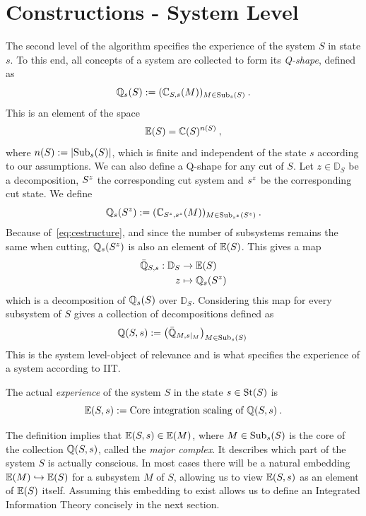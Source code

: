 \section{Constructions - System Level} \label{sec:alg-sys}

The second level of the algorithm specifies the experience of the system $S$ in state $s$.
To this end, all concepts of a system are collected to form its \emph{Q-shape}, defined as
\begin{equation} \label{eq:Q-Shape}
\mathbb{Q}_s(S) := (\mathbb{C}_{S,s}(M))_{M \in \mathrm{Sub}_s(S)}  \:.
\end{equation}
This is an element of the space 
\begin{equation}\label{eq:ExpS}
\mathbb{E}(S) = \mathbb{C}(S)^{n(S)} \:,
\end{equation}
where $n(S) := |\mathrm{Sub}_s(S)|$, which is finite and independent of the state $s$ according to our assumptions.
We can also define a Q-shape for any cut of $S$. Let $z \in \mathbb D_S$ be a decomposition, ${S}^{z}$ the corresponding cut system and ${s}^{z}$ be the
corresponding cut state. We define
\begin{equation} \label{eq:Q-Shape-cuts}
\mathbb{Q}_s({S}^{z}) := (\mathbb{C}_{{S}^{z},{s}^{z}}(M))_{M \in \mathrm{Sub}_{{s}^{z}}({S}^{z})} \:.
\end{equation}
Because of~\eqref{eq:cestructure}, and since the number of subsystems remains the same when cutting, 
$\mathbb{Q}_s({S}^{z})$ is also an element of $\mathbb{E}(S)$.
This gives a map
\begin{align*}
\bar {\mathbb{Q}}_{S,s}: \mathbb D_S &\rightarrow \mathbb{E}(S)\\
z &\mapsto \mathbb{Q}_s({S}^{z})
\end{align*}
which is a decomposition of $\mathbb{Q}_s(S)$ over $\mathbb D_S$. Considering this map for every subsystem of $S$ gives a collection of decompositions
defined as
\begin{align*}
\mathbb{Q}(S,s) := \big( \bar {\mathbb{Q}}_{M,s|_M} \big)_{M \in \mathrm{Sub}_s(S)} \:
\end{align*}
This is the system level-object of relevance and is what specifies the experience of a system according to IIT.

\begin{definition}\label{def:ActualExp}
The actual \emph{experience} of the system $S$ in the state $s \in \text{St}(S)$ is
\begin{equation}\label{eq:Exp}
\mathbb{E}(S,s) :=  \textrm{Core integration scaling of } \mathbb{Q}(S,s) \:.
\end{equation}
\end{definition}
The definition implies that $\mathbb{E}(S,s) \in \mathbb{E}(M)$, where $M \in \mathrm{Sub}_s(S)$ is the core of the collection $\mathbb{Q}(S,s)$, called the \emph{major complex}.
It describes which part of the system $S$ is actually conscious.
In most cases there will be a natural embedding $\mathbb{E}(M) \hookrightarrow \mathbb{E}(S)$ for a subsystem $M$ of $S$, allowing us to view $\mathbb{E}(S,s)$ as an element of $\mathbb{E}(S)$ itself. Assuming this embedding
to exist allows us to define an Integrated Information Theory concisely in the next section.

